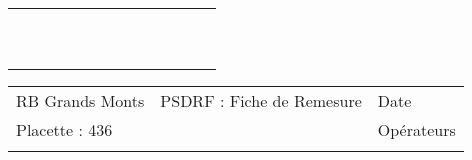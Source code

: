 \documentclass[a4paper, landscape]{article}\usepackage[]{graphicx}\usepackage[]{color}
\begin{document}
{\begin{tabular}{|p{1cm}|p{2cm}|p{1.6cm}|p{1.6cm}|p{1.6cm}|p{1.6cm}|p{1.5cm}|p{1.5cm}|p{1.5cm}|p{1.5cm}|p{1.5cm}|p{7.5cm}|p{5cm}|}
   \rowcolor[gray]{0.95} \hline
 &  &  &  &  &  &  &  &  &  &  &  &  \\ 
   \hline
 &  &  &  &  &  &  &  &  &  &  &  &  \\ 
   \rowcolor[gray]{0.95} \hline
 &  &  &  &  &  &  &  &  &  &  &  &  \\ 
   \hline
 &  &  &  &  &  &  &  &  &  &  &  &  \\ 
   \rowcolor[gray]{0.95} \hline
 &  &  &  &  &  &  &  &  &  &  &  &  \\ 
   \hline
 &  &  &  &  &  &  &  &  &  &  &  &  \\ 
   \rowcolor[gray]{0.95} \hline
 &  &  &  &  &  &  &  &  &  &  &  &  \\ 
   \hline
 &  &  &  &  &  &  &  &  &  &  &  &  \\ 
   \rowcolor[gray]{0.95} \hline
 &  &  &  &  &  &  &  &  &  &  &  &  \\ 
   \hline
 &  &  &  &  &  &  &  &  &  &  &  &  \\ 
   \rowcolor[gray]{0.95} \hline
 &  &  &  &  &  &  &  &  &  &  &  &  \\ 
   \hline
\end{tabular}
}

\begin{tabular}{p{10cm}p{10cm}p{8cm}}
  RB Grands Monts & PSDRF : Fiche de Remesure & Date \\ 
  Placette : 436 &  & Opérateurs \\ 
   &  &  \\ 
  \end{tabular}
\end{document}
